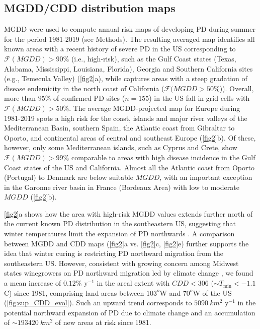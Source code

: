 \subsection{MGDD/CDD distribution maps}

MGDD were used to compute annual risk
maps of developing PD during summer for the period 1981-2019 (see Methods).
The resulting averaged map identifies all known areas with a recent history of
severe PD in the US corresponding to $\mathcal{F}(MGDD) > 90\%$ (i.e.,
high-risk), such as the Gulf Coast states (Texas, Alabama, Mississippi,
Louisiana, Florida), Georgia and Southern California sites (e.g., Temecula
Valley) (\cref{fig2}a), while captures areas with a steep gradation of
disease endemicity in the north coast of California ($\mathcal{F}(MGDD>50\%$)).
    Overall, more than $95\%$ of confirmed PD sites ($n = 155$) in the US
    fall in grid cells with $\mathcal{F}(MGDD) > 50 \%$.
    The average MGDD-projected map for Europe during 1981-2019 spots a high
    risk for the coast, islands and major river valleys of the Mediterranean
    Basin, southern Spain, the Atlantic coast from Gibraltar to Oporto, and
    continental areas of central and southeast Europe (\cref{fig2}b). Of these,
    however, only some Mediterranean islands, such as Cyprus and Crete, show
$\mathcal{F}(MGDD) > 99\%$ comparable to areas with high disease incidence in
    the Gulf Coast states of the US and California. Almost all the Atlantic
    coast from Oporto (Portugal) to Denmark are below suitable $MGDD$, with an
    important exception in the Garonne river basin in France (Bordeaux Area)
    with low to moderate $MGDD$ (\cref{fig2}b).

    \cref{fig2}a shows how the area with high-risk MGDD values extends further
    north of the current known PD distribution in the southeastern US,
    suggesting
    that winter temperatures limit the expansion of PD northwards
    \cite{Hopkins2002}. A comparison between MGDD and CDD maps (\cref{fig2}a
    vs.
    \cref{fig2}c, \cref{fig2}e) further supports the idea that winter curing is
    restricting PD northward migration from the southeastern US. However,
    consistent with growing concern among Midwest states winegrowers on PD
    northward migration led by climate change \cite{Galvez2010}, we found a
    mean
    increase of $0.12 \%$ y$^{-1}$ in the areal extent with $CDD < 306$ ($\sim
T_{\textrm{min}} < -1.1$ \textdegree C) since 1981, comprising land areas
    between $103^o$W and $70^o$W of the US (\cref{fig:sup_CDD_evol}). Such an
    upward
    trend corresponds to $\SI{5090}{km^2}$ y$^{-1}$ in the potential northward
    expansion of PD due to climate change and an accumulation of $\sim
\SI{193420}{km^2}$ of new areas at risk since 1981.

